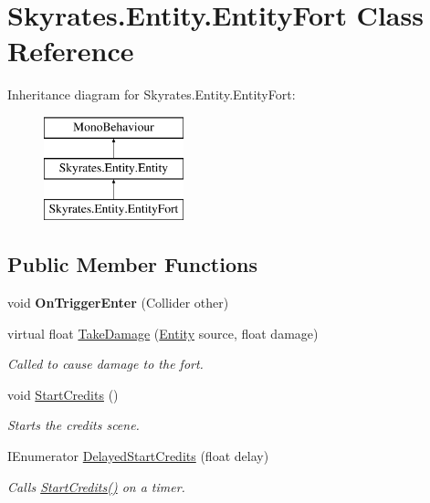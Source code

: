 \hypertarget{class_skyrates_1_1_entity_1_1_entity_fort}{\section{Skyrates.\-Entity.\-Entity\-Fort Class Reference}
\label{class_skyrates_1_1_entity_1_1_entity_fort}
}
Inheritance diagram for Skyrates.\-Entity.\-Entity\-Fort\-:\begin{figure}[H]
\begin{center}
\leavevmode
\includegraphics[height=3.000000cm]{class_skyrates_1_1_entity_1_1_entity_fort}
\end{center}
\end{figure}
\subsection*{Public Member Functions}
\begin{DoxyCompactItemize}
\item 
\hypertarget{class_skyrates_1_1_entity_1_1_entity_fort_af81e458f0a68bbbc5edd19c6096327c4}{void {\bfseries On\-Trigger\-Enter} (Collider other)}\label{class_skyrates_1_1_entity_1_1_entity_fort_af81e458f0a68bbbc5edd19c6096327c4}

\item 
virtual float \hyperlink{class_skyrates_1_1_entity_1_1_entity_fort_a1076c0a76bde21b94379feddf047b73c}{Take\-Damage} (\hyperlink{class_skyrates_1_1_entity_1_1_entity}{Entity} source, float damage)
\begin{DoxyCompactList}\small\item\em Called to cause damage to the fort. \end{DoxyCompactList}\item 
void \hyperlink{class_skyrates_1_1_entity_1_1_entity_fort_ab9cf0ed9030aee1d8fb4ec014baf24a1}{Start\-Credits} ()
\begin{DoxyCompactList}\small\item\em Starts the credits scene. \end{DoxyCompactList}\item 
I\-Enumerator \hyperlink{class_skyrates_1_1_entity_1_1_entity_fort_ad602ef2e9ad8f114b202a6eb6a0cccf5}{Delayed\-Start\-Credits} (float delay)
\begin{DoxyCompactList}\small\item\em Calls \hyperlink{class_skyrates_1_1_entity_1_1_entity_fort_ab9cf0ed9030aee1d8fb4ec014baf24a1}{Start\-Credits()} on a timer. \end{DoxyCompactList}\end{DoxyCompactItemize}
